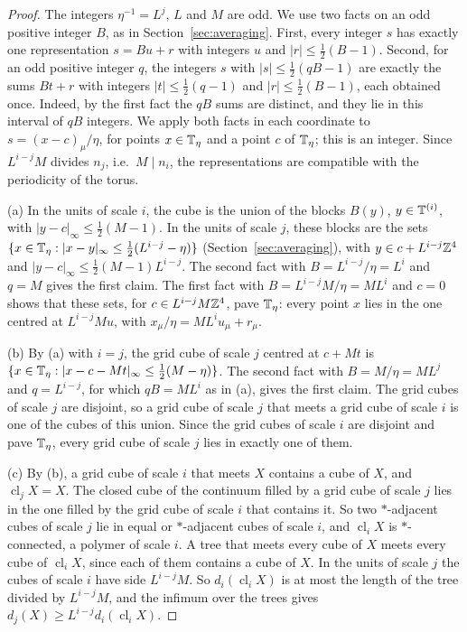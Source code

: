\begin{proof}
The integers $\eta^{-1}=L^j$, $L$ and $M$ are odd. We use two facts on an odd positive integer $B$, as in Section~\ref{sec:averaging}. First, every integer $s$ has exactly one representation $s=Bu+r$ with integers $u$ and $|r|\le\frac12(B-1)$. Second, for an odd positive integer $q$, the integers $s$ with $|s|\le\frac12(qB-1)$ are exactly the sums $Bt+r$ with integers $|t|\le\frac12(q-1)$ and $|r|\le\frac12(B-1)$, each obtained once. Indeed, by the first fact the $qB$ sums are distinct, and they lie in this interval of $qB$ integers. We apply both facts in each coordinate to $s=(x-c)_\mu/\eta$, for points $x\in\mathbb T_\eta$ and a point $c$ of $\mathbb T_\eta$; this is an integer. Since $L^{i-j}M$ divides $n_j$, i.e.\ $M\mid n_i$, the representations are compatible with the periodicity of the torus.

(a) In the units of scale $i$, the cube is the union of the blocks $B(y)$, $y\in\mathbb T^{(i)}$, with $|y-c|_\infty\le\frac12(M-1)$. In the units of scale $j$, these blocks are the sets $\{x\in\mathbb T_\eta:|x-y|_\infty\le\frac12(L^{i-j}-\eta)\}$ (Section~\ref{sec:averaging}), with $y\in c+L^{i-j}\mathbb Z^4$ and $|y-c|_\infty\le\frac12(M-1)L^{i-j}$. The second fact with $B=L^{i-j}/\eta=L^i$ and $q=M$ gives the first claim. The first fact with $B=L^{i-j}M/\eta=ML^i$ and $c=0$ shows that these sets, for $c\in L^{i-j}M\mathbb Z^4$, pave $\mathbb T_\eta$: every point $x$ lies in the one centred at $L^{i-j}Mu$, with $x_\mu/\eta=ML^iu_\mu+r_\mu$.

(b) By (a) with $i=j$, the grid cube of scale $j$ centred at $c+Mt$ is $\{x\in\mathbb T_\eta:|x-c-Mt|_\infty\le\frac12(M-\eta)\}$. The second fact with $B=M/\eta=ML^j$ and $q=L^{i-j}$, for which $qB=ML^i$ as in (a), gives the first claim. The grid cubes of scale $j$ are disjoint, so a grid cube of scale $j$ that meets a grid cube of scale $i$ is one of the cubes of this union. Since the grid cubes of scale $i$ are disjoint and pave $\mathbb T_\eta$, every grid cube of scale $j$ lies in exactly one of them.

(c) By (b), a grid cube of scale $i$ that meets $X$ contains a cube of $X$, and $\operatorname{cl}_jX=X$. The closed cube of the continuum filled by a grid cube of scale $j$ lies in the one filled by the grid cube of scale $i$ that contains it. So two $*$-adjacent cubes of scale $j$ lie in equal or $*$-adjacent cubes of scale $i$, and $\operatorname{cl}_iX$ is $*$-connected, a polymer of scale $i$. A tree that meets every cube of $X$ meets every cube of $\operatorname{cl}_iX$, since each of them contains a cube of $X$. In the units of scale $j$ the cubes of scale $i$ have side $L^{i-j}M$. So $d_i(\operatorname{cl}_iX)$ is at most the length of the tree divided by $L^{i-j}M$, and the infimum over the trees gives $d_j(X)\ge L^{i-j}d_i(\operatorname{cl}_iX)$.
\end{proof}

